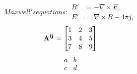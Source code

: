 \documentclass[11pt, oneside]{article}   	%
\begin{document}
%
\begin{subequations}
Maxwell's equations:
\begin{align}
        B'&=-\nabla \times E,\\
        E'&=\nabla \times B - 4\pi j,
\end{align}
\end{subequations}
%
\begin{equation} \vect{A\indices{^i^j}} =
\begin{bmatrix}
	1 & 2 & 3 \\
	3 & 4 & 5 \\
	7 & 8 & 9
\end{bmatrix}
\end{equation}
%
\[
	\begin{matrix} %
		a & b \\
		c & d \\
	\end{matrix}
\]

%
\end{document}
